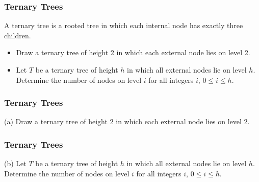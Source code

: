 \documentclass{beamer}
\begin{document}
\begin{frame}
\frametitle{Ternary Trees }
\Large
A ternary tree is a rooted tree in which  each internal node has exactly three children.

\begin{itemize}
\item[(a)] Draw a ternary tree of height 2 in which each external node lies on level 2.
\item[(b)] Let $T$ be a ternary tree of height $h$ in which all external nodes lie on level $h$. Determine the number of nodes on level $i$ for all integers $i$, $0 \leq i \leq h$.
\end{itemize}

\end{frame}
\begin{frame}
\frametitle{Ternary Trees }
\large
\vspace{-3cm}
 (a) Draw a ternary tree of height 2 in which each external node lies on level 2.


\end{frame}
\begin{frame}
\frametitle{Ternary Trees }
\vspace{-3cm}
\large
(b) Let $T$ be a ternary tree of height $h$ in which all external nodes lie on level $h$.\\ Determine the number of nodes on level $i$ for all integers $i$, $0 \leq i \leq h$.


\end{frame}
\end{document}
